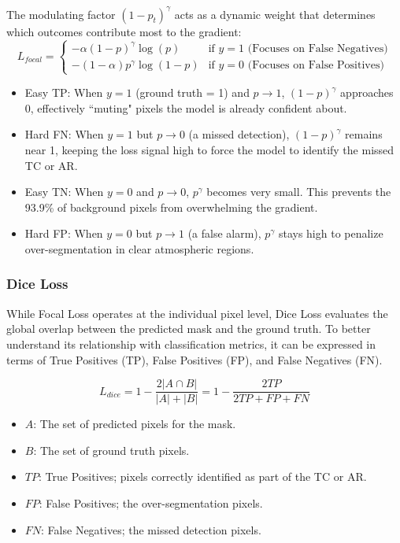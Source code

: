 The modulating factor $(1-p_t)^\gamma$ acts as a dynamic weight that determines which outcomes contribute most to the gradient:
\begin{equation}
L_{focal} = 
\begin{cases} 
-\alpha (1 - p)^\gamma \log(p) & \text{if } y=1 \text{ (Focuses on False Negatives)} \\
-(1 - \alpha) p^\gamma \log(1 - p) & \text{if } y=0 \text{ (Focuses on False Positives)} 
\end{cases}
\end{equation}
\begin{itemize}
    \item Easy TP: When $y=1$ (ground truth = 1) and $p \to 1$, $(1-p)^\gamma$ approaches 0, effectively ``muting" pixels the model is already confident about.
    \item Hard FN: When $y=1$ but $p \to 0$ (a missed detection), $(1-p)^\gamma$ remains near 1, keeping the loss signal high to force the model to identify the missed TC or AR.
    \item Easy TN: When $y=0$ and $p \to 0$, $p^\gamma$ becomes very small. This prevents the 93.9\% of background pixels from overwhelming the gradient.
    \item Hard FP: When $y=0$ but $p \to 1$ (a false alarm), $p^\gamma$ stays high to penalize over-segmentation in clear atmospheric regions.
\end{itemize}

\subsubsection{Dice Loss}
While Focal Loss operates at the individual pixel level, Dice Loss evaluates the global overlap between the predicted mask and the ground truth. To better understand its relationship with classification metrics, it can be expressed in terms of True Positives (TP), False Positives (FP), and False Negatives (FN).

\begin{equation}
L_{dice} = 1 - \frac{2|A \cap B|}{|A| + |B|} = 1 - \frac{2TP}{2TP + FP + FN}
\end{equation}

\begin{itemize}
    \item $A$: The set of predicted pixels for the mask.
    \item $B$: The set of ground truth pixels.
    \item $TP$: True Positives; pixels correctly identified as part of the TC or AR.
    \item $FP$: False Positives; the over-segmentation pixels.
    \item $FN$: False Negatives; the missed detection pixels.
\end{itemize}


